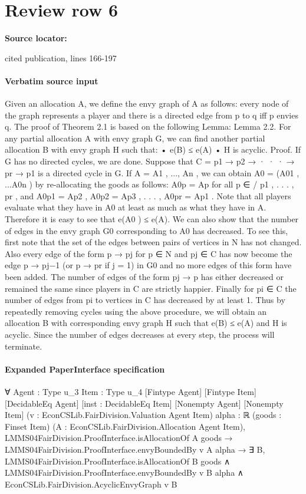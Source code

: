 \documentclass[10pt]{article}
\begin{document}
\section*{Review row 6}
\textbf{Source locator:} {\footnotesize\raggedright cited publication, lines 166-\allowbreak{}197\par}
\paragraph{Verbatim source input}
\begin{ReviewVerbatim}
Given an allocation A, we define the envy graph of A as
follows: every node of the graph represents a player and
there is a directed edge from p to q iff p envies q. The proof
of Theorem 2.1 is based on the following Lemma:
Lemma 2.2. For any partial allocation A with envy graph
G, we can find another partial allocation B with envy graph
H such that:
• e(B) ≤ e(A)
• H is acyclic.
Proof. If G has no directed cycles, we are done. Suppose
that C = p1 → p2 → · · · → pr → p1 is a directed cycle in
G. If A = {A1 , ..., An }, we can obtain A0 = (A01 , ...A0n )
by re-allocating the goods as follows: A0p = Ap for all p ∈
/
{p1 , . . . , pr }, and A0p1 = Ap2 , A0p2 = Ap3 , . . . , A0pr = Ap1 .
Note that all players evaluate what they have in A0 at
least as much as what they have in A. Therefore it is easy
to see that e(A0 ) ≤ e(A).
We can also show that the number of edges in the envy
graph G0 corresponding to A0 has decreased. To see this,
first note that the set of the edges between pairs of vertices
in N \C has not changed. Also every edge of the form p → pj
for p ∈ N \C and pj ∈ C has now become the edge p → pj−1
(or p → pr if j = 1) in G0 and no more edges of this form
have been added. The number of edges of the form pj → p
has either decreased or remained the same since players in
C are strictly happier. Finally for pi ∈ C the number of
edges from pi to vertices in C has decreased by at least 1.
Thus by repeatedly removing cycles using the above procedure, we will obtain an allocation B with corresponding
envy graph H such that e(B) ≤ e(A) and H is acyclic. Since
the number of edges decreases at every step, the process will
terminate.
\end{ReviewVerbatim}


\paragraph{Expanded PaperInterface specification}
\begin{ReviewVerbatim}
∀ {Agent : Type u_3} {Item : Type u_4} [Fintype Agent] [Fintype Item] [DecidableEq Agent] [inst : DecidableEq Item]
  [Nonempty Agent] [Nonempty Item] (v : EconCSLib.FairDivision.Valuation Agent Item) {alpha : ℝ} (goods : Finset Item)
  (A : EconCSLib.FairDivision.Allocation Agent Item),
  LMMS04FairDivision.ProofInterface.isAllocationOf A goods →
    LMMS04FairDivision.ProofInterface.envyBoundedBy v A alpha →
      ∃ B,
        LMMS04FairDivision.ProofInterface.isAllocationOf B goods ∧
          LMMS04FairDivision.ProofInterface.envyBoundedBy v B alpha ∧ EconCSLib.FairDivision.AcyclicEnvyGraph v B
\end{ReviewVerbatim}
\end{document}
